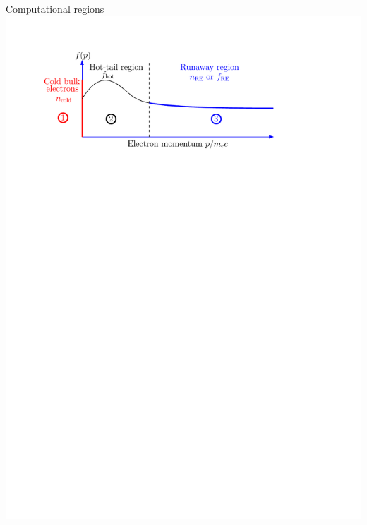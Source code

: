 \documentclass[titleunderline,widescreen1610]{chalmerspresentation}
\begin{document}
    \begin{frame}{Computational regions}
        \includegraphics[width=\textwidth]{figs/regions.pdf}
    \end{frame}
\end{document}
